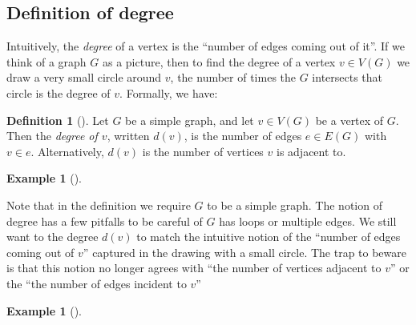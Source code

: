 \documentclass[10pt,]{book}
\theoremstyle{plain}
\theoremstyle{definition}
\newtheorem{definition}[theorem]{Definition}
\theoremstyle{definition}
\newtheorem{example}[theorem]{Example}
\theoremstyle{definition}
\begin{document}
\subsection[{Definition of degree}]{Definition of degree}\label{subsection-4}
\hypertarget{p-19}{}%
Intuitively, the \emph{degree} of a vertex is the ``number of edges coming out of it''. If we think of a graph \(G\) as a picture, then to find the degree of a vertex \(v\in V(G)\) we draw a very small circle around \(v\), the number of times the \(G\) intersects that circle is the degree of \(v\).  Formally, we have:%
\begin{definition}[{}]\label{definition-6}
\hypertarget{p-20}{}%
Let \(G\) be a simple graph, and let \(v\in V(G)\) be a vertex of \(G\).  Then the \emph{degree of \(v\)}, written \(d(v)\), is the number of edges \(e\in E(G)\) with \(v\in e\). Alternatively, \(d(v)\) is the number of vertices \(v\) is adjacent to.%
\end{definition}
\begin{example}[]\label{example-3}
\end{example}
\hypertarget{p-21}{}%
Note that in the definition we require \(G\) to be a simple graph.  The notion of degree has a few pitfalls to be careful of \(G\) has loops or multiple edges.  We still want to the degree \(d(v)\) to match the intuitive notion of the ``number of edges coming out of \(v\)'' captured in the drawing with a small circle.  The trap to beware is that this notion no longer agrees with ``the number of vertices adjacent to \(v\)'' or the ``the number of edges incident to \(v\)''%
\begin{example}[]\label{example-4}
\end{example}
\typeout{************************************************}
\typeout{************************************************}
\end{document}
